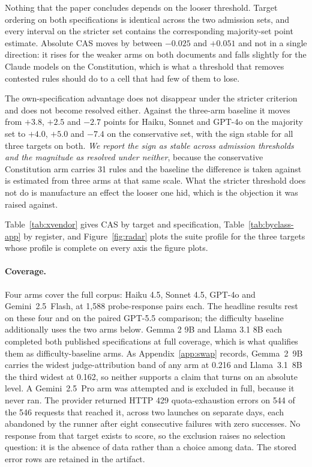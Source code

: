 \documentclass{article}
\begin{document}
Nothing that the paper concludes depends on the looser threshold. Target ordering on both
specifications is identical across the two admission sets, and every interval on the stricter
set contains the corresponding majority-set point estimate. Absolute CAS moves by between
$-0.025$ and $+0.051$ and not in a single direction: it rises for the weaker arms on both
documents and falls slightly for the Claude models on the Constitution, which is what a
threshold that removes contested rules should do to a cell that had few of them to lose.

The own-specification advantage does not disappear under the stricter criterion and does not
become resolved either. Against the three-arm baseline it moves from $+3.8$, $+2.5$ and $-2.7$
points for Haiku, Sonnet and GPT-4o on the majority set to $+4.0$, $+5.0$ and $-7.4$ on the
conservative set, with the sign stable for all three targets on both. \emph{We report the sign
as stable across admission thresholds and the magnitude as resolved under neither}, because the
conservative Constitution arm carries 31 rules and the baseline the difference is taken against
is estimated from three arms at that same scale. What the stricter threshold does not do is
manufacture an effect the looser one hid, which is the objection it was raised against.

Table~\ref{tab:xvendor} gives CAS by target and specification,
Table~\ref{tab:byclass-app} by register, and Figure~\ref{fig:radar} plots the suite profile for
the three targets whose profile is complete on every axis the figure plots.

\paragraph{Coverage.}
Four arms cover the full corpus: Haiku 4.5, Sonnet 4.5, GPT-4o and Gemini~2.5~Flash, at 1{,}588
probe-response pairs each. The headline results rest on these four and on the paired GPT-5.5
comparison; the difficulty baseline additionally uses the two arms below. Gemma 2 9B and Llama 3.1 8B each completed both published
specifications at full coverage, which is what qualifies them as difficulty-baseline arms. As Appendix~\ref{app:swap} records, Gemma~2~9B carries the widest judge-attribution
band of any arm at 0.216 and Llama~3.1~8B the third widest at 0.162, so neither supports a claim that turns on an absolute
level. A Gemini~2.5~Pro arm was attempted and is excluded in full, because it never ran. The
provider returned HTTP 429 quota-exhaustion errors on 544 of the 546 requests that reached it,
across two launches on separate days, each abandoned by the runner after eight consecutive
failures with zero successes. No response from that target exists to score, so the exclusion
raises no selection question: it is the absence of data rather than a choice among data. The
stored error rows are retained in the artifact.
\end{document}
